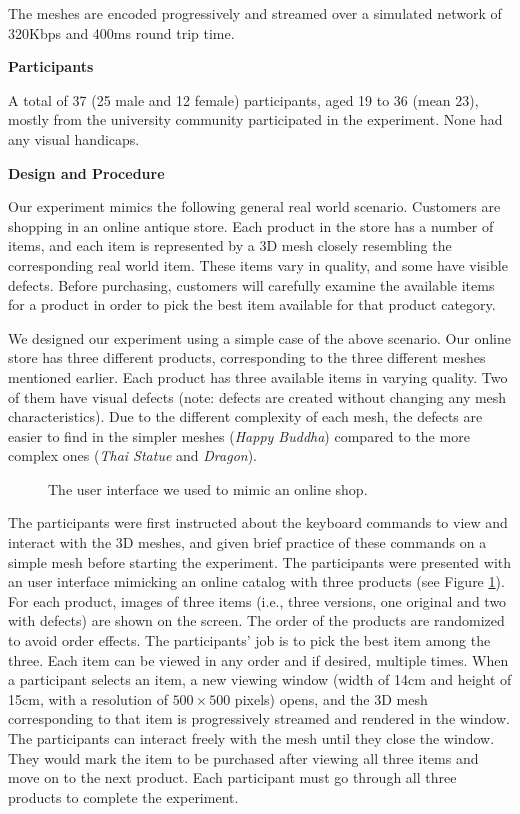 The meshes are encoded progressively and streamed over a simulated network of 320Kbps and 400ms round trip time.  

\textbf{Participants}

A total of 37 (25 male and 12 female) participants, aged 19 to 36
(mean 23), mostly from the university community participated in the
experiment. None had any visual handicaps.

\textbf{Design and Procedure}

Our experiment mimics the following general real world scenario. Customers
are shopping in an online antique store. Each product in the store has a
number of items, and each item is represented by a 3D mesh closely resembling
the corresponding real world item. These items vary in quality, and some
have visible defects. Before purchasing, customers will carefully examine the
available items for a product in order to pick the best item available for
that product category.

We designed our experiment using a simple case of the above scenario. 
Our online store has three different products,
corresponding to the three different meshes mentioned earlier. Each product
has three available items in varying quality. Two of them have visual
defects (note: defects are created without changing any mesh
characteristics). Due to the different complexity of each mesh, the defects
are easier to find in the simpler meshes (\textit{Happy Buddha}) compared to the more
complex ones (\textit{Thai Statue} and \textit{Dragon}).

\begin{figure}
    \centering
    \caption{The user interface we used to mimic an online shop.}
    \label{f:user:shop}
\end{figure}
The participants were first instructed about the keyboard commands 
to view and interact with the 3D meshes, and given brief practice of
these commands on a simple mesh before starting the experiment. The
participants were presented with an user interface mimicking an online
catalog with three products (see Figure \ref{f:user:shop}).  For each product, images of three items 
(i.e., three versions, one original and two with defects) are shown on the screen.
The order of the products are randomized to avoid order effects.
The participants' job is to pick the best item among the three. Each item 
can be viewed in any order and if desired, multiple times.  When 
a participant selects an item, a new viewing window (width of 14cm and
height of 15cm, with a resolution of $500 \times 500$ pixels) opens, and the 3D mesh corresponding to that item is
progressively streamed and rendered in the window.  
The participants can interact freely
with the mesh until they close the window.
They would mark the item to be purchased after viewing all three items and
move on to the next product. Each participant must go through all three products to
complete the experiment.


